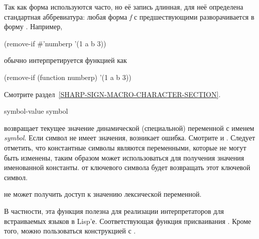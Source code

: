 \begin{defspec}
Так как форма  используются часто, но её запись длинная,
для неё определена стандартная аббревиатура: любая форма \emph{f} с
предшествующими  разворачивается в форму .
Например,
\begin{lisp}
(remove-if \#'numberp '(1 a b 3))
\end{lisp}
обычно интерпретируется функцией  как
\begin{lisp}
(remove-if (function numberp) '(1 a b 3))
\end{lisp}
Смотрите раздел~\ref{SHARP-SIGN-MACRO-CHARACTER-SECTION}.
\end{defspec}

\begin{defun}[Функция]
symbol-value symbol

 возвращает текущее значение динамической (специальной)
переменной с именем \emph{symbol}.
Если символ не имеет значения, возникает ошибка. Смотрите  и
. 
Следует отметить, что константные символы являются переменными, которые не могут
быть изменены, таким образом  может использоваться для
получения значения именованной константы.  от ключевого
символа будет возвращать этот ключевой символ.

 не может получить доступ к значению лексической переменной.

В частности, эта функция полезна для реализации интерпретаторов для встраиваемых
языков в Lisp'е.
Соответствующая функция присваивания . Кроме того, можно пользоваться
конструкцией  с .
\end{defun}

